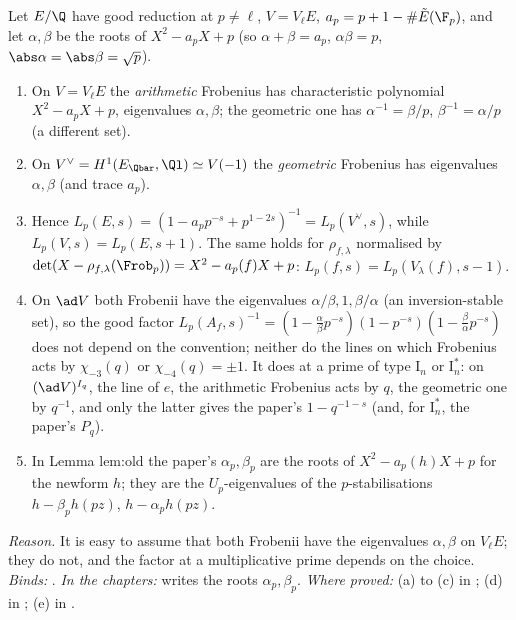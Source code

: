 \begin{convention}\label{conv:notation:bc3}
Let $E/\Q$ have good reduction at $p\ne\ell$, $V=V_\ell E$, $a_p=p+1-\#\tilde E(\F_p)$, and let $\alpha,\beta$ be the roots of
$X^2-a_pX+p$ (so $\alpha+\beta=a_p$, $\alpha\beta=p$, $\abs\alpha=\abs\beta=\sqrt p$).
\begin{enumerate}[label=(\alph*)]
\item On $V=V_\ell E$ the \emph{arithmetic} Frobenius has characteristic polynomial $X^2-a_pX+p$, eigenvalues $\alpha,\beta$; the
geometric one has $\alpha^{-1}=\beta/p$, $\beta^{-1}=\alpha/p$ (a different set).
\item On $V^\vee=H^1(E_{\Qbar},\Ql)\simeq V(-1)$ the \emph{geometric} Frobenius has eigenvalues $\alpha,\beta$ (and trace $a_p$).
\item Hence $L_p(E,s)=(1-a_pp^{-s}+p^{1-2s})^{-1}=L_p(V^\vee,s)$, while $L_p(V,s)=L_p(E,s+1)$. The same holds for $\rho_{f,\lambda}$
normalised by $\det(X-\rho_{f,\lambda}(\Frob_p))=X^2-a_p(f)X+p$: $L_p(f,s)=L_p(V_\lambda(f),s-1)$.
\item On $\ad V$ both Frobenii have the eigenvalues $\alpha/\beta,1,\beta/\alpha$ (an inversion-stable set), so the good factor
$L_p(A_f,s)^{-1}=(1-\frac\alpha\beta p^{-s})(1-p^{-s})(1-\frac\beta\alpha p^{-s})$ does not depend on the convention; neither do the lines on
which Frobenius acts by $\chi_{-3}(q)$ or $\chi_{-4}(q)=\pm1$. It does at a prime of type $\mathrm I_n$ or $\mathrm I_n^*$: on $(\ad V)^{I_q}$, the
line of $e$, the arithmetic Frobenius acts by $q$, the geometric one by $q^{-1}$, and only the latter gives the paper's $1-q^{-1-s}$
(and, for $\mathrm I_n^*$, the paper's $P_q$).
\item In Lemma lem:old the paper's $\alpha_p,\beta_p$ are the roots of $X^2-a_p(h)X+p$ for the newform $h$; they are the $U_p$-eigenvalues
of the $p$-stabilisations $h-\beta_ph(pz)$, $h-\alpha_ph(pz)$.
\end{enumerate}
\end{convention}

\noindent\emph{Reason.} It is easy to assume that both Frobenii have the eigenvalues $\alpha,\beta$ on $V_\ell E$; they do not, and the factor at a multiplicative prime depends on the choice.
\emph{Binds:} .
\emph{In the chapters:}  writes the roots $\alpha_p,\beta_p$. \emph{Where proved:} (a) to (c) in
; (d) in ; (e) in .

